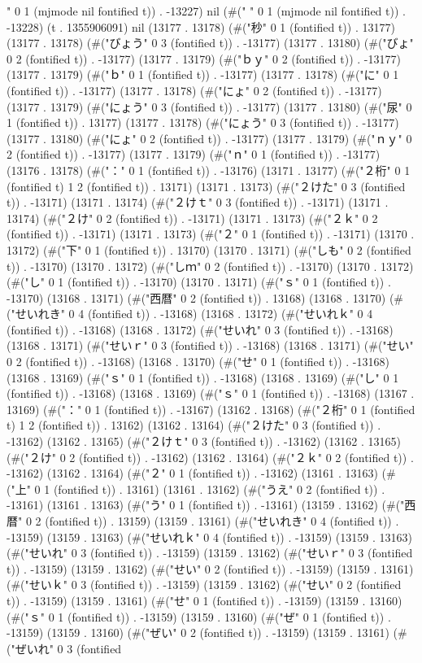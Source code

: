 " 0 1 (mjmode nil fontified t)) . -13227) nil (#(" " 0 1 (mjmode nil fontified t)) . -13228) (t . 1355906091) nil (13177 . 13178) (#("秒" 0 1 (fontified t)) . 13177) (13177 . 13178) (#("びょう" 0 3 (fontified t)) . -13177) (13177 . 13180) (#("びょ" 0 2 (fontified t)) . -13177) (13177 . 13179) (#("ｂｙ" 0 2 (fontified t)) . -13177) (13177 . 13179) (#("ｂ" 0 1 (fontified t)) . -13177) (13177 . 13178) (#("に" 0 1 (fontified t)) . -13177) (13177 . 13178) (#("にょ" 0 2 (fontified t)) . -13177) (13177 . 13179) (#("にょう" 0 3 (fontified t)) . -13177) (13177 . 13180) (#("尿" 0 1 (fontified t)) . 13177) (13177 . 13178) (#("にょう" 0 3 (fontified t)) . -13177) (13177 . 13180) (#("にょ" 0 2 (fontified t)) . -13177) (13177 . 13179) (#("ｎｙ" 0 2 (fontified t)) . -13177) (13177 . 13179) (#("ｎ" 0 1 (fontified t)) . -13177) (13176 . 13178) (#("：" 0 1 (fontified t)) . -13176) (13171 . 13177) (#("２桁" 0 1 (fontified t) 1 2 (fontified t)) . 13171) (13171 . 13173) (#("２けた" 0 3 (fontified t)) . -13171) (13171 . 13174) (#("２けｔ" 0 3 (fontified t)) . -13171) (13171 . 13174) (#("２け" 0 2 (fontified t)) . -13171) (13171 . 13173) (#("２ｋ" 0 2 (fontified t)) . -13171) (13171 . 13173) (#("２" 0 1 (fontified t)) . -13171) (13170 . 13172) (#("下" 0 1 (fontified t)) . 13170) (13170 . 13171) (#("しも" 0 2 (fontified t)) . -13170) (13170 . 13172) (#("しｍ" 0 2 (fontified t)) . -13170) (13170 . 13172) (#("し" 0 1 (fontified t)) . -13170) (13170 . 13171) (#("ｓ" 0 1 (fontified t)) . -13170) (13168 . 13171) (#("西暦" 0 2 (fontified t)) . 13168) (13168 . 13170) (#("せいれき" 0 4 (fontified t)) . -13168) (13168 . 13172) (#("せいれｋ" 0 4 (fontified t)) . -13168) (13168 . 13172) (#("せいれ" 0 3 (fontified t)) . -13168) (13168 . 13171) (#("せいｒ" 0 3 (fontified t)) . -13168) (13168 . 13171) (#("せい" 0 2 (fontified t)) . -13168) (13168 . 13170) (#("せ" 0 1 (fontified t)) . -13168) (13168 . 13169) (#("ｓ" 0 1 (fontified t)) . -13168) (13168 . 13169) (#("し" 0 1 (fontified t)) . -13168) (13168 . 13169) (#("ｓ" 0 1 (fontified t)) . -13168) (13167 . 13169) (#("：" 0 1 (fontified t)) . -13167) (13162 . 13168) (#("２桁" 0 1 (fontified t) 1 2 (fontified t)) . 13162) (13162 . 13164) (#("２けた" 0 3 (fontified t)) . -13162) (13162 . 13165) (#("２けｔ" 0 3 (fontified t)) . -13162) (13162 . 13165) (#("２け" 0 2 (fontified t)) . -13162) (13162 . 13164) (#("２ｋ" 0 2 (fontified t)) . -13162) (13162 . 13164) (#("２" 0 1 (fontified t)) . -13162) (13161 . 13163) (#("上" 0 1 (fontified t)) . 13161) (13161 . 13162) (#("うえ" 0 2 (fontified t)) . -13161) (13161 . 13163) (#("う" 0 1 (fontified t)) . -13161) (13159 . 13162) (#("西暦" 0 2 (fontified t)) . 13159) (13159 . 13161) (#("せいれき" 0 4 (fontified t)) . -13159) (13159 . 13163) (#("せいれｋ" 0 4 (fontified t)) . -13159) (13159 . 13163) (#("せいれ" 0 3 (fontified t)) . -13159) (13159 . 13162) (#("せいｒ" 0 3 (fontified t)) . -13159) (13159 . 13162) (#("せい" 0 2 (fontified t)) . -13159) (13159 . 13161) (#("せいｋ" 0 3 (fontified t)) . -13159) (13159 . 13162) (#("せい" 0 2 (fontified t)) . -13159) (13159 . 13161) (#("せ" 0 1 (fontified t)) . -13159) (13159 . 13160) (#("ｓ" 0 1 (fontified t)) . -13159) (13159 . 13160) (#("ぜ" 0 1 (fontified t)) . -13159) (13159 . 13160) (#("ぜい" 0 2 (fontified t)) . -13159) (13159 . 13161) (#("ぜいれ" 0 3 (fontified 